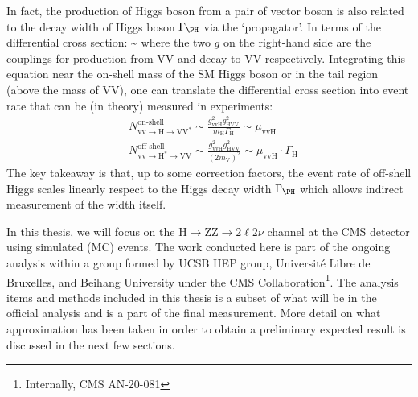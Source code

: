 In fact, the production of Higgs boson from a pair of vector boson is also related to the
decay width of Higgs boson $\Gamma_\text{\PH}$ via the `propagator'\cite{offshell_poc}. In terms of the
differential cross section:
\be
\label{eqn:diff_xsec}
\sim 
{}
\ee
where the two $g$ on the right-hand side are the couplings for production from VV and decay
to VV respectively. Integrating this equation near the on-shell mass of the SM Higgs boson 
or in the tail region (above the mass of VV), one can translate the differential cross section
into event rate that can be (in theory) measured in experiments:
\begin{equation}
\begin{split}
&N_{\mathrm{vv} \rightarrow \mathrm{H} \rightarrow \mathrm{VV}^{*}}^{\text{on-shell}} \sim \frac{g_{\mathrm{vvH}}^{2} g_{\mathrm{HVV}}^{2}}{m_{\mathrm{H}} \Gamma_{\mathrm{H}}} \sim \mu_{\mathrm{vvH}}
\\
&N_{\mathrm{vv} \rightarrow \mathrm{H}^{*} \rightarrow \mathrm{VV}}^{\text{off-shell}} \sim \frac{g_{\mathrm{vvH}}^{2} g_{\mathrm{HVV}}^{2}}{\left(2 m_{\mathrm{V}}\right)^{2}} \sim \mu_{\mathrm{vvH}} \cdot \Gamma_{\mathrm{H}}
\end{split}
\end{equation}
The key takeaway is that, up to some correction factors, the event rate of off-shell Higgs scales
linearly respect to the Higgs decay width $\Gamma_\text{\PH}$ which allows indirect
measurement of the width itself.

In this thesis, we will focus on the $\mathrm{H} \rightarrow \mathrm{ZZ} \rightarrow 2\ell2\nu$ channel
at the CMS detector using simulated (MC) events. The work conducted here is part of the ongoing analysis
within a group formed by UCSB HEP group, Universit\'e Libre de Bruxelles, and Beihang University under
the CMS Collaboration\footnote{Internally, CMS AN-20-081}. The analysis items and methods included in this
thesis is a subset of what will be in the official analysis and is a part of the final measurement. More
detail on what approximation has been taken in order to obtain a preliminary expected result is discussed
in the next few sections.




